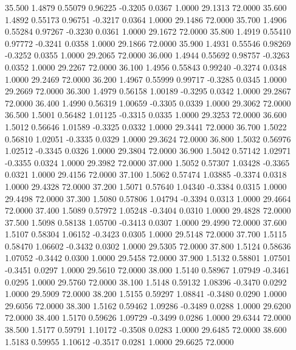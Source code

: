   35.500   1.4879   0.55079   0.96225  -0.3205   0.0367   1.0000  29.1313  72.0000
  35.600   1.4892   0.55173   0.96751  -0.3217   0.0364   1.0000  29.1486  72.0000
  35.700   1.4906   0.55284   0.97267  -0.3230   0.0361   1.0000  29.1672  72.0000
  35.800   1.4919   0.55410   0.97772  -0.3241   0.0358   1.0000  29.1866  72.0000
  35.900   1.4931   0.55546   0.98269  -0.3252   0.0355   1.0000  29.2065  72.0000
  36.000   1.4944   0.55692   0.98757  -0.3263   0.0352   1.0000  29.2267  72.0000
  36.100   1.4956   0.55843   0.99240  -0.3274   0.0348   1.0000  29.2469  72.0000
  36.200   1.4967   0.55999   0.99717  -0.3285   0.0345   1.0000  29.2669  72.0000
  36.300   1.4979   0.56158   1.00189  -0.3295   0.0342   1.0000  29.2867  72.0000
  36.400   1.4990   0.56319   1.00659  -0.3305   0.0339   1.0000  29.3062  72.0000
  36.500   1.5001   0.56482   1.01125  -0.3315   0.0335   1.0000  29.3253  72.0000
  36.600   1.5012   0.56646   1.01589  -0.3325   0.0332   1.0000  29.3441  72.0000
  36.700   1.5022   0.56810   1.02051  -0.3335   0.0329   1.0000  29.3624  72.0000
  36.800   1.5032   0.56976   1.02512  -0.3345   0.0326   1.0000  29.3804  72.0000
  36.900   1.5042   0.57142   1.02971  -0.3355   0.0324   1.0000  29.3982  72.0000
  37.000   1.5052   0.57307   1.03428  -0.3365   0.0321   1.0000  29.4156  72.0000
  37.100   1.5062   0.57474   1.03885  -0.3374   0.0318   1.0000  29.4328  72.0000
  37.200   1.5071   0.57640   1.04340  -0.3384   0.0315   1.0000  29.4498  72.0000
  37.300   1.5080   0.57806   1.04794  -0.3394   0.0313   1.0000  29.4664  72.0000
  37.400   1.5089   0.57972   1.05248  -0.3404   0.0310   1.0000  29.4828  72.0000
  37.500   1.5098   0.58138   1.05700  -0.3413   0.0307   1.0000  29.4990  72.0000
  37.600   1.5107   0.58304   1.06152  -0.3423   0.0305   1.0000  29.5148  72.0000
  37.700   1.5115   0.58470   1.06602  -0.3432   0.0302   1.0000  29.5305  72.0000
  37.800   1.5124   0.58636   1.07052  -0.3442   0.0300   1.0000  29.5458  72.0000
  37.900   1.5132   0.58801   1.07501  -0.3451   0.0297   1.0000  29.5610  72.0000
  38.000   1.5140   0.58967   1.07949  -0.3461   0.0295   1.0000  29.5760  72.0000
  38.100   1.5148   0.59132   1.08396  -0.3470   0.0292   1.0000  29.5909  72.0000
  38.200   1.5155   0.59297   1.08841  -0.3480   0.0290   1.0000  29.6056  72.0000
  38.300   1.5162   0.59462   1.09286  -0.3489   0.0288   1.0000  29.6200  72.0000
  38.400   1.5170   0.59626   1.09729  -0.3499   0.0286   1.0000  29.6344  72.0000
  38.500   1.5177   0.59791   1.10172  -0.3508   0.0283   1.0000  29.6485  72.0000
  38.600   1.5183   0.59955   1.10612  -0.3517   0.0281   1.0000  29.6625  72.0000
